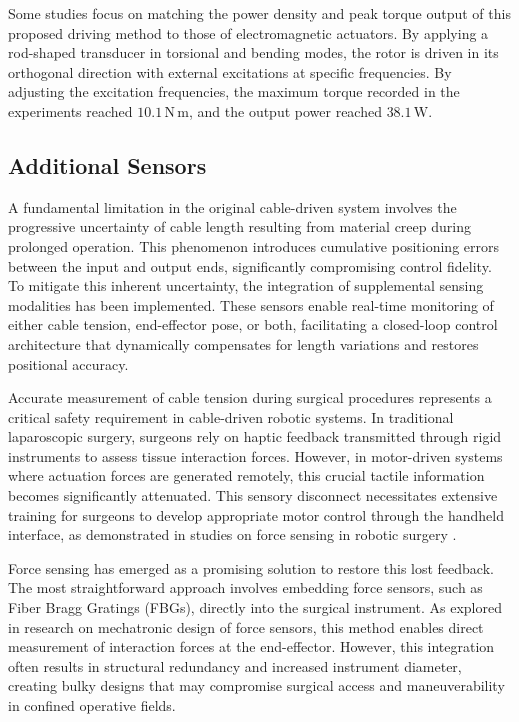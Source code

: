 Some studies focus on matching the power density and peak torque output of this proposed driving method to those of electromagnetic actuators. By applying a rod-shaped transducer in torsional and bending modes, the rotor is driven in its orthogonal direction with external excitations at specific frequencies. By adjusting the excitation frequencies, the maximum torque recorded in the experiments reached $10.1\,\mathrm{N\,m}$, and the output power reached $38.1\,\mathrm{W}$\cite{wu_rotary_2021}.

\subsection{Additional Sensors}

A fundamental limitation in the original cable-driven system involves the progressive uncertainty of cable length resulting from material creep during prolonged operation. This phenomenon introduces cumulative positioning errors between the input and output ends, significantly compromising control fidelity\cite{liang_novel_2017}. To mitigate this inherent uncertainty, the integration of supplemental sensing modalities has been implemented. These sensors enable real-time monitoring of either cable tension, end-effector pose, or both, facilitating a closed-loop control architecture that dynamically compensates for length variations and restores positional accuracy.



Accurate measurement of cable tension during surgical procedures represents a critical safety requirement in cable-driven robotic systems. In traditional laparoscopic surgery, surgeons rely on haptic feedback transmitted through rigid instruments to assess tissue interaction forces. However, in motor-driven systems where actuation forces are generated remotely, this crucial tactile information becomes significantly attenuated. This sensory disconnect necessitates extensive training for surgeons to develop appropriate motor control through the handheld interface, as demonstrated in studies on force sensing in robotic surgery \cite{trejos_force_2010}.

Force sensing has emerged as a promising solution to restore this lost feedback. The most straightforward approach involves embedding force sensors, such as Fiber Bragg Gratings (FBGs), directly into the surgical instrument. As explored in research on mechatronic design of force sensors\cite{zemiti_mechatronic_2007}, this method enables direct measurement of interaction forces at the end-effector. However, this integration often results in structural redundancy and increased instrument diameter, creating bulky designs that may compromise surgical access and maneuverability in confined operative fields.

